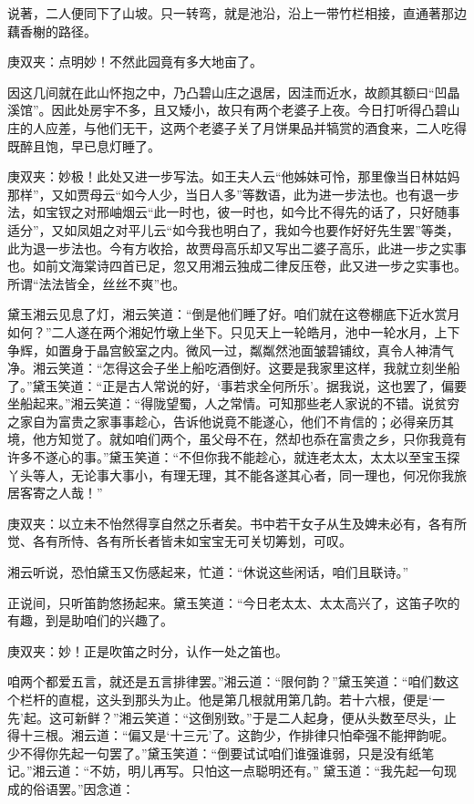 \begin{parag}
    说著，二人便同下了山坡。只一转弯，就是池沿，沿上一带竹栏相接，直通著那边藕香榭的路径。\begin{note}庚双夹：点明妙！不然此园竟有多大地亩了。\end{note}因这几间就在此山怀抱之中，乃凸碧山庄之退居，因洼而近水，故颜其额曰“凹晶溪馆”。因此处房宇不多，且又矮小，故只有两个老婆子上夜。今日打听得凸碧山庄的人应差，与他们无干，这两个老婆子关了月饼果品并犒赏的酒食来，二人吃得既醉且饱，早已息灯睡了。\begin{note}庚双夹：妙极！此处又进一步写法。如王夫人云“他姊妹可怜，那里像当日林姑妈那样”，又如贾母云“如今人少，当日人多”等数语，此为进一步法也。也有退一步法，如宝钗之对邢岫烟云“此一时也，彼一时也，如今比不得先的话了，只好随事适分”，又如凤姐之对平儿云“如今我也明白了，我如今也要作好好先生罢”等类，此为退一步法也。今有方收拾，故贾母高乐却又写出二婆子高乐，此进一步之实事也。如前文海棠诗四首已足，忽又用湘云独成二律反压卷，此又进一步之实事也。所谓“法法皆全，丝丝不爽”也。\end{note}
\end{parag}


\begin{parag}
    黛玉湘云见息了灯，湘云笑道：“倒是他们睡了好。咱们就在这卷棚底下近水赏月如何？”二人遂在两个湘妃竹墩上坐下。只见天上一轮皓月，池中一轮水月，上下争辉，如置身于晶宫鲛室之内。微风一过，粼粼然池面皱碧铺纹，真令人神清气净。湘云笑道：“怎得这会子坐上船吃酒倒好。这要是我家里这样，我就立刻坐船了。”黛玉笑道：“正是古人常说的好，‘事若求全何所乐’。据我说，这也罢了，偏要坐船起来。”湘云笑道：“得陇望蜀，人之常情。可知那些老人家说的不错。说贫穷之家自为富贵之家事事趁心，告诉他说竟不能遂心，他们不肯信的；必得亲历其境，他方知觉了。就如咱们两个，虽父母不在，然却也忝在富贵之乡，只你我竟有许多不遂心的事。”黛玉笑道：“不但你我不能趁心，就连老太太，太太以至宝玉探丫头等人，无论事大事小，有理无理，其不能各遂其心者，同一理也，何况你我旅居客寄之人哉！”\begin{note}庚双夹：以立未不怡然得享自然之乐者矣。书中若干女子从生及婢未必有，各有所觉、各有所恃、各有所长者皆未如宝宝无可关切筹划，可叹。\end{note}湘云听说，恐怕黛玉又伤感起来，忙道：“休说这些闲话，咱们且联诗。”
\end{parag}


\begin{parag}
    正说间，只听笛韵悠扬起来。黛玉笑道：“今日老太太、太太高兴了，这笛子吹的有趣，到是助咱们的兴趣了。\begin{note}庚双夹：妙！正是吹笛之时分，认作一处之笛也。\end{note}咱两个都爱五言，就还是五言排律罢。”湘云道：“限何韵？”黛玉笑道：“咱们数这个栏杆的直棍，这头到那头为止。他是第几根就用第几韵。若十六根，便是‘一先’起。这可新鲜？”湘云笑道：“这倒别致。”于是二人起身，便从头数至尽头，止得十三根。湘云道：“偏又是‘十三元’了。这韵少，作排律只怕牵强不能押韵呢。少不得你先起一句罢了。”黛玉笑道：“倒要试试咱们谁强谁弱，只是没有纸笔记。”湘云道：“不妨，明儿再写。只怕这一点聪明还有。” 黛玉道：“我先起一句现成的俗语罢。”因念道：
\end{parag}


